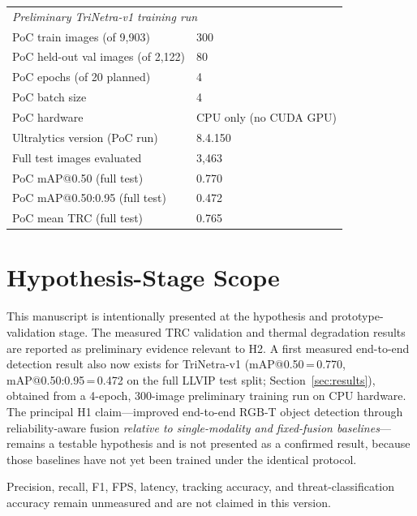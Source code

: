 \documentclass[conference]{IEEEtran}
\begin{document}
\begin{table}[!t]
\begin{tabular}{p{}p{}}
\midrule
\multicolumn{2}{l}{\textit{Preliminary TriNetra-v1 training run}} \\
PoC train images (of 9{,}903) & 300 \\
PoC held-out val images (of 2{,}122) & 80 \\
PoC epochs (of 20 planned) & 4 \\
PoC batch size & 4 \\
PoC hardware & CPU only (no CUDA GPU) \\
Ultralytics version (PoC run) & 8.4.150 \\
Full test images evaluated & 3,463 \\
PoC mAP@0.50 (full test) & 0.770 \\
PoC mAP@0.50:0.95 (full test) & 0.472 \\
PoC mean TRC (full test) & 0.765 \\
\bottomrule
\end{tabular}
\end{table}

\section{Hypothesis-Stage Scope}

This manuscript is intentionally presented at the hypothesis and
prototype-validation stage. The measured TRC validation and thermal
degradation results are reported as preliminary evidence relevant to
H2. A first measured end-to-end detection result also now exists for
TriNetra-v1 (mAP@0.50\,=\,0.770, mAP@0.50:0.95\,=\,0.472 on the full
LLVIP test split; Section~\ref{sec:results}), obtained from a
4-epoch, 300-image preliminary training run on CPU hardware. The
principal H1 claim---improved end-to-end RGB-T object detection
through reliability-aware fusion \emph{relative to single-modality
and fixed-fusion baselines}---remains a testable hypothesis and is
not presented as a confirmed result, because those baselines have not
yet been trained under the identical protocol.

Precision, recall, F1, FPS, latency, tracking accuracy, and
threat-classification accuracy remain unmeasured and are not claimed
in this version.
\end{document}
